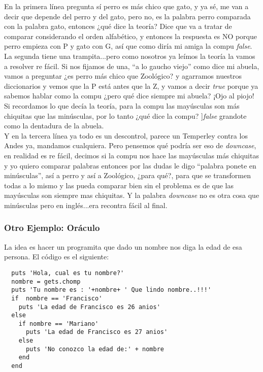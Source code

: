 En la primera línea pregunta sí perro es más chico que gato, y ya sé, me van a decir que depende del perro y del gato, pero no, es la palabra perro comparada con la palabra gato, entonces ¿qué dice la teoría? Dice que va a tratar de comparar considerando el orden alfabético, y entonces la respuesta es NO porque perro empieza con P y gato con G, así que como diría mi amiga la compu \emph{false}.\\
La segunda tiene una trampita...pero como nosotros ya leímos la teoría la vamos a resolver re fácil. Si nos fijamos de una, “a lo gaucho viejo” como dice mi abuela, vamos a preguntar ¿es perro más chico que Zoológico? y agarramos nuestros diccionarios y vemos que la P está antes que la Z, y vamos a decir \emph{true} porque ya sabemos hablar como la compu ¿pero qué dice siempre mi abuela? ¡Ojo al piojo! Si recordamos lo que decía la teoría, para la compu las mayúsculas son más chiquitas que las minúsculas, por lo tanto ¿qué dice la compu? ]\emph{false} grandote como la dentadura de la abuela.\\

Y en la tercera línea ya todo es un descontrol, parece un Temperley contra los Andes ya, mandamos cualquiera. Pero pensemos qué podría ser eso de \emph{downcase}, en realidad es re fácil, decimos si la compu nos hace las mayúsculas más chiquitas y yo quiero comparar palabras entonces por las dudas le digo “palabra ponete en minúsculas”, así a perro y así a Zoológico, ¿para qué?, para que se transformen todas a lo mismo y las pueda comparar bien sin el problema es de que las mayúsculas son siempre mas chiquitas. Y la palabra \emph{downcase} no es otra cosa que minúsculas pero en inglés...era recontra fácil al final.


\subsubsection{Otro Ejemplo: Oráculo}
La idea es hacer un programita que dado un nombre nos diga la edad de esa persona. El código es el siguiente:

\begin{lstlisting}
  puts 'Hola, cual es tu nombre?'
  nombre = gets.chomp
  puts 'Tu nombre es : '+nombre+ ' Que lindo nombre..!!!'
  if  nombre == 'Francisco'
    puts 'La edad de Francisco es 26 anios'
  else
    if nombre == 'Mariano'
      puts 'La edad de Francisco es 27 anios'
    else
      puts 'No conozco la edad de:' + nombre
    end
  end
\end{lstlisting}


